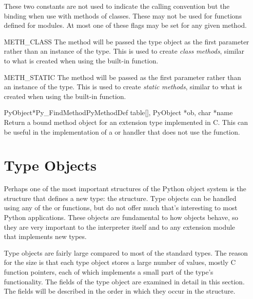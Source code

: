 These two constants are not used to indicate the calling convention
but the binding when use with methods of classes.  These may not be
used for functions defined for modules.  At most one of these flags
may be set for any given method.

\begin{datadesc}{METH_CLASS}
  The method will be passed the type object as the first parameter
  rather than an instance of the type.  This is used to create
  \emph{class methods}, similar to what is created when using the
   built-in
  function.
\end{datadesc}

\begin{datadesc}{METH_STATIC}
  The method will be passed \NULL{} as the first parameter rather than
  an instance of the type.  This is used to create \emph{static
  methods}, similar to what is created when using the
   built-in
  function.
\end{datadesc}


\begin{cfuncdesc}{PyObject*}{Py_FindMethod}{PyMethodDef table[],
                                            PyObject *ob, char *name}
  Return a bound method object for an extension type implemented in
  C.  This can be useful in the implementation of a
   or  handler that does not
  use the  function.
\end{cfuncdesc}


\section{Type Objects \label{type-structs}}

Perhaps one of the most important structures of the Python object
system is the structure that defines a new type: the
 structure.  Type objects can be handled using any
of the  or  functions,
but do not offer much that's interesting to most Python applications.
These objects are fundamental to how objects behave, so they are very
important to the interpreter itself and to any extension module that
implements new types.

Type objects are fairly large compared to most of the standard types.
The reason for the size is that each type object stores a large number
of values, mostly C function pointers, each of which implements a
small part of the type's functionality.  The fields of the type object
are examined in detail in this section.  The fields will be described
in the order in which they occur in the structure.

